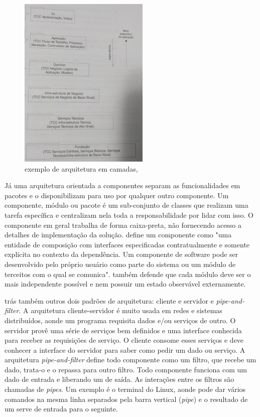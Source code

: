 \begin{figure}[h]
	\centering
	\label{fig11}
		\includegraphics[keepaspectratio=true,scale=0.5]{figuras/arqcamadas.jpg}
	\caption{exemplo de arquitetura em camadas, \cite{Larman2005}}
\end{figure}

Já uma arquitetura orientada a componentes separam as funcionalidades em pacotes e o disponibilizam para uso por qualquer outro componente. Um componente, módulo ou pacote é um sub-conjunto de classes que realizam uma tarefa específica e centralizam nela toda a responsabilidade por lidar com isso. O componente em geral trabalha de forma caixa-preta, não fornecendo acesso a detalhes de implementação da solução. \cite{Szyperski2002} define um componente como "uma entidade de composição com interfaces especificadas contratualmente e somente explícita no contexto da dependência. Um componente de software pode ser desenvolvido pelo próprio usuário como parte do sistema ou um módulo de terceitos com o qual se comunica". \cite{Szyperski2002} também defende que cada módulo deve ser o mais independente possível e nem possuir um estado observável externamente.

\cite{Goodliffe2007} trás também outros dois padrões de arquitetura: cliente e servidor e \textit{pipe-and-filter}. A arquitetura cliente-servidor é muito usada em redes e sistemas distribuídos, aonde um programa requisita dados e/ou serviços de outro. O servidor provê uma série de serviços bem definidos e uma interface conhecida para receber as requisições de serviço. O cliente consome esses serviços e deve conhecer a interface do servidor para saber como pedir um dado ou serviço. A arquitetura \textit{pipe-and-filter} define todo componente como um filtro, que recebe um dado, trata-o e o repassa para outro filtro. Todo componente funciona com um dado de entrada e liberando um de saída. As interações entre os filtros são chamadas de \textit{pipes}. Um exemplo é o terminal do Linux, aonde pode dar vários comandos na mesma linha separados pela barra vertical (\textit{pipe}) e o resultado de um serve de entrada para o seguinte.

